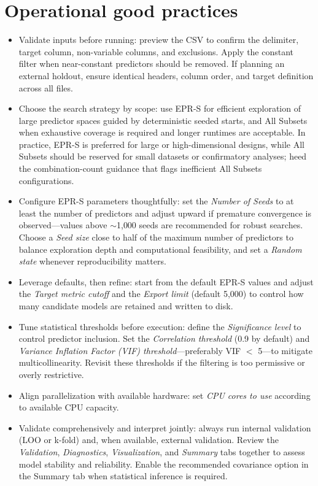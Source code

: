 \documentclass[11pt,a4paper]{article}
\begin{document}
\section{Operational good practices}
\begin{itemize}
  \item Validate inputs before running: preview the CSV to confirm the delimiter, target column, non-variable columns, and exclusions. Apply the constant filter when near-constant predictors should be removed. If planning an external holdout, ensure identical headers, column order, and target definition across all files.
  \item Choose the search strategy by scope: use EPR-S for efficient exploration of large predictor spaces guided by deterministic seeded starts, and All Subsets when exhaustive coverage is required and longer runtimes are acceptable. In practice, EPR-S is preferred for large or high-dimensional designs, while All Subsets should be reserved for small datasets or confirmatory analyses; heed the combination-count guidance that flags inefficient All Subsets configurations.
  \item Configure EPR-S parameters thoughtfully: set the \emph{Number of Seeds} to at least the number of predictors and adjust upward if premature convergence is observed—values above $\sim$1{,}000 seeds are recommended for robust searches. Choose a \emph{Seed size} close to half of the maximum number of predictors to balance exploration depth and computational feasibility, and set a \emph{Random state} whenever reproducibility matters.
  \item Leverage defaults, then refine: start from the default EPR-S values and adjust the \emph{Target metric cutoff} and the \emph{Export limit} (default 5,000) to control how many candidate models are retained and written to disk.
  \item Tune statistical thresholds before execution: define the \emph{Significance level} to control predictor inclusion. Set the \emph{Correlation threshold} (0.9 by default) and \emph{Variance Inflation Factor (VIF) threshold}—preferably VIF $<$ 5—to mitigate multicollinearity. Revisit these thresholds if the filtering is too permissive or overly restrictive.
  \item Align parallelization with available hardware: set \emph{CPU cores to use} according to available CPU capacity.
  \item Validate comprehensively and interpret jointly: always run internal validation (LOO or k-fold) and, when available, external validation. Review the \emph{Validation}, \emph{Diagnostics}, \emph{Visualization}, and \emph{Summary} tabs together to assess model stability and reliability. Enable the recommended covariance option in the Summary tab when statistical inference is required.

\end{itemize}
\end{document}
